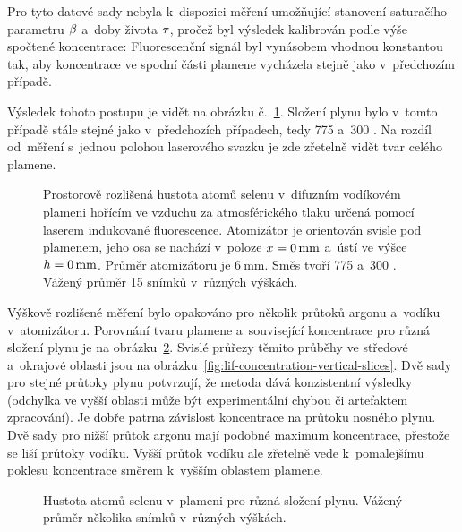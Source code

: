 Pro tyto datové sady nebyla k~dispozici měření umožňující stanovení
saturačího parametru $\beta$ a~doby života $\tau$,
pročež byl výsledek kalibrován podle výše spočtené koncentrace:
Fluorescenční signál byl vynásobem vhodnou konstantou tak,
aby koncentrace ve spodní části plamene vycházela stejně
jako v~předchozím případě.

Výsledek tohoto postupu je vidět na obrázku
č.~\ref{fig:lif-concentration-vertical-700+300}.
Složení plynu bylo v~tomto případě stále stejné jako v~předchozích případech,
tedy \SI{775}{\sccm}  a~\SI{300}{\sccm} .
Na rozdíl od~měření s~jednou polohou laserového svazku je zde zřetelně vidět
tvar celého plamene.

\begin{figure}[htp]
	\centering
	
	\caption{Prostorově rozlišená hustota atomů selenu v~difuzním
		vodíkovém plameni hořícím ve vzduchu za atmosférického tlaku
		určená pomocí laserem indukované fluorescence.
		Atomizátor je orientován svisle pod plamenem,
		jeho osa se nachází v~poloze $x = \SI{0}{\milli\metre}$
		a~ústí ve výšce $h = \SI{0}{\milli\metre}$.
		Průměr atomizátoru je $\SI{6}{\milli\metre}$.
		Směs tvoří \SI{775}{\sccm}  a~\SI{300}{\sccm} .
		Vážený průměr 15 snímků v~různých výškách.}
	\label{fig:lif-concentration-vertical-700+300}
\end{figure}

Výškově rozlišené měření bylo opakováno pro několik průtoků argonu
a~vodíku v~atomizátoru.
Porovnání tvaru plamene a~související koncentrace pro různá složení
plynu je na obrázku~\ref{fig:lif-concentration-vertical-compositions}.
Svislé průřezy těmito průběhy ve středové a~okrajové oblasti jsou
na obrázku~\ref{fig:lif-concentration-vertical-slices}.
Dvě sady pro stejné průtoky plynu potvrzují,
že metoda dává konzistentní výsledky
(odchylka ve vyšší oblasti může být experimentální chybou
či artefaktem zpracování).
Je dobře patrna závislost koncentrace na průtoku nosného plynu.
Dvě sady pro nižší průtok argonu mají podobné maximum koncentrace,
přestože se liší průtoky vodíku.
Vyšší průtok vodíku ale zřetelně vede k~pomalejšímu poklesu koncentrace
směrem k~vyšším oblastem plamene.

\begin{figure}[htp]
	\centering
	
	\caption{Hustota atomů selenu v~plameni pro různá složení plynu.
		Vážený průměr několika snímků v~různých výškách.}
	\label{fig:lif-concentration-vertical-compositions}
\end{figure}

